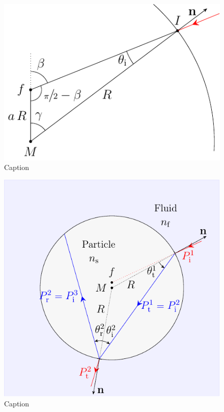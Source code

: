 \begin{figure}[htp]
  \centering
  \includegraphics[]{Plots/cache/angles.pdf}
  \caption{Caption}
  \label{fig:Th-angles}
\end{figure}

\lipsum[1-2]

\begin{figure}[htp]
  \centering
  \includegraphics[]{Plots/cache/ray.pdf}
  \caption{Caption}
  \label{fig:Th-ray_particle}
\end{figure}

